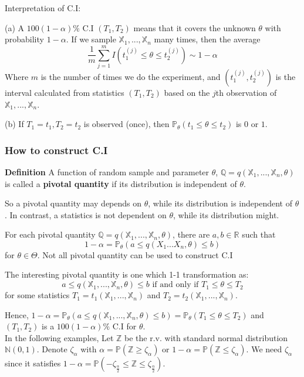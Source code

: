 Interpretation of C.I:


(a) A $100(1-\alpha)\%$ C.I $(T_1,T_2)$ means that it covers the unknown $\theta$ with probability $1-\alpha$. If we sample $\mathbb{X}_1, ..., \mathbb{X}_n$ many times,
then the average $$\frac{1}{m} \sum_{j=1}^m I(t_1^{(j)} \leq \theta \leq t_2^{(j)}) \sim 1-\alpha$$
Where $m$ is the number of times we do the experiment, and $(t_1^{(j)}, t_2^{(j)})$ is the interval calculated from statistics $(T_1,T_2)$ based on the $j$th observation of $\mathbb{X}_1, ..., \mathbb{X}_n$.

(b) If $T_1 = t_1, T_2 = t_2$ is observed (once),
 then $\mathbb{P}_\theta (t_1 \leq \theta \leq t_2)$ is $0$ or $1$.

\subsubsection{How to construct C.I} 

\textbf{Definition} A function of random sample and parameter $\theta$,
 $ \mathbb{Q} = q( \mathbb{X}_1, ..., \mathbb{X}_n, \theta)$ is called a \textbf{pivotal quantity} if its distribution is independent of $\theta$.

So a pivotal quantity may depends on $\theta$, while its distribution is independent of $\theta$. In contrast, a statistics is not dependent on $\theta$, while its distribution might.

For each pivotal quantity $\mathbb{Q} = q( \mathbb{X}_1, ..., \mathbb{X}_n, \theta)$, 
there are $a, b \in \mathbb{R}$ such that $$ 1-\alpha = \mathbb{P}_\theta (a \leq q( X_1... X_n, \theta) \leq b)$$ for $\theta \in \Theta$. Not all pivotal quantity can be used to construct C.I
 
The interesting pivotal quantity is one which 1-1 transformation as:
$$a \leq q(\mathbb{X}_1, ..., \mathbb{X}_n, \theta) \leq b \text{ if and only if } T_1 \leq \theta \leq T_2$$
for some statistics $T_1 = t_1 (\mathbb{X}_1, ..., \mathbb{X}_n)$ and $T_2 = t_2 (\mathbb{X}_1, ..., \mathbb{X}_n)$.

Hence, $1 -\alpha = \mathbb{P}_\theta (a \leq q(\mathbb{X}_1, ..., \mathbb{X}_n, \theta) \leq b) = \mathbb{P}_\theta (T_1 \leq \theta \leq T_2)$ and $(T_1, T_2)$ is a $100(1-\alpha)\%$ C.I for $\theta$.\\

In the following examples, Let $\mathbb{Z}$ be the r.v. with standard normal distribution $\mathbb{N}(0,1)$.
Denote $\zeta_\alpha$ with $\alpha = \mathbb{P}(\mathbb{Z} \geq \zeta_\alpha)$ 
or $1-\alpha = \mathbb{P}(\mathbb{Z} \leq \zeta_\alpha)$. 
We need $\zeta_\alpha$ since it satisfies $1-\alpha = \mathbb{P}(-\zeta_{\frac{\alpha}{2}}\leq \mathbb{Z} \leq \zeta_{\frac{\alpha}{2}})$.

